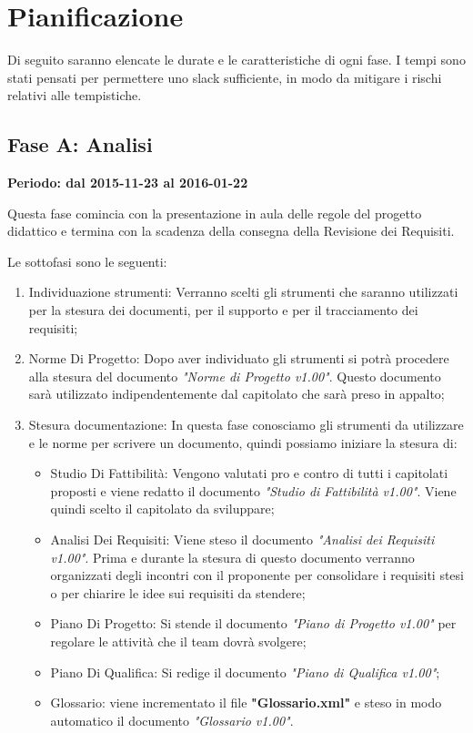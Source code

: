 \documentclass[../PianoProgetto.tex]{subfiles}
\begin{document}
\section{Pianificazione}

	Di seguito saranno elencate le durate e le caratteristiche di ogni fase. I tempi sono stati pensati per permettere uno slack sufficiente, in modo da mitigare i rischi relativi alle tempistiche.
	
	\subsection{Fase A: Analisi}
	
	\textbf{Periodo: dal 2015-11-23 al 2016-01-22}

	Questa fase comincia con la presentazione in aula delle regole del progetto didattico e termina con la scadenza della consegna della Revisione dei Requisiti.

	Le sottofasi sono le seguenti:
	\begin{enumerate}
		\item Individuazione strumenti: Verranno scelti gli strumenti che saranno utilizzati per la stesura dei documenti, per il supporto e per il tracciamento dei requisiti;
		\item Norme Di Progetto: Dopo aver individuato gli strumenti si potrà procedere alla stesura del documento \textit{"Norme di Progetto v1.00"}. Questo documento sarà utilizzato indipendentemente dal capitolato che sarà preso in appalto;
		\item Stesura documentazione: In questa fase conosciamo gli strumenti da utilizzare e le norme per scrivere un documento, quindi possiamo iniziare la stesura di:
		\begin{itemize}
		\item Studio Di Fattibilità: Vengono valutati pro e contro di tutti i capitolati proposti e viene redatto il documento \textit{"Studio di Fattibilità v1.00"}. Viene quindi scelto il capitolato da sviluppare;
		\item Analisi Dei Requisiti: Viene steso il documento \textit{"Analisi dei Requisiti v1.00"}. Prima e durante la stesura di questo documento verranno organizzati degli incontri con il proponente per consolidare i requisiti stesi o per chiarire le idee sui requisiti da stendere;
		\item Piano Di Progetto: Si stende il documento \textit{"Piano di Progetto v1.00"} per regolare le attività che il team dovrà svolgere;
		\item Piano Di Qualifica: Si redige il documento \textit{"Piano di Qualifica v1.00"};
		\item Glossario: viene incrementato il file \textbf{"Glossario.xml"} e steso in modo automatico il documento \textit{"Glossario v1.00"}.
		\end{itemize}
	\end{enumerate}
		
\end{document}
